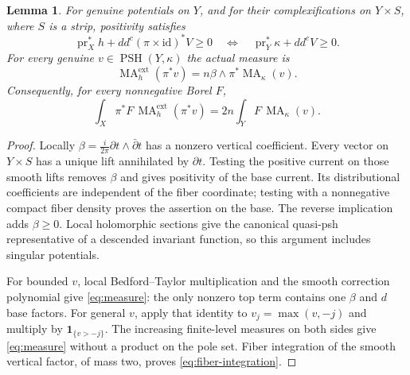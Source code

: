 \documentclass[11pt]{article}
\newcommand{\ddc}{dd^c}
\newcommand{\PSH}{\operatorname{PSH}}
\newcommand{\MA}{\operatorname{MA}}
\newtheorem{lemma}[theorem]{Lemma}
\theoremstyle{remark}\newtheorem{remark}[theorem]{Remark}
\begin{document}
\begin{lemma}\label{lem:descent}
For genuine potentials on $Y$, and for their complexifications on
$Y\times S$, where $S$ is a strip, positivity satisfies
\[
 \operatorname{pr}_X^*h+\ddc(\pi\times\mathrm{id})^*V\geq0
 \quad\Longleftrightarrow\quad
 \operatorname{pr}_Y^*\kappa+\ddc V\geq0.
\]
For every genuine $v\in\PSH(Y,\kappa)$ the actual measure is
\begin{equation}\label{eq:measure}
 \MA_h^{\mathrm{ext}}(\pi^*v)
     =n\beta\wedge\pi^*\MA_\kappa(v).
\end{equation}
Consequently, for every nonnegative Borel $F$,
\begin{equation}\label{eq:fiber-integration}
 \int_X\pi^*F\,\MA_h^{\mathrm{ext}}(\pi^*v)
       =2n\int_YF\,\MA_\kappa(v).
\end{equation}
\end{lemma}
\begin{proof}
Locally $\beta=\frac{i}{2\pi}\partial t\wedge\bar\partial t$ has
a nonzero vertical coefficient. Every vector on $Y\times S$ has a unique
lift annihilated by $\partial t$. Testing the positive current on those
smooth lifts removes $\beta$ and gives positivity of the base current.
Its distributional coefficients are independent of the fiber coordinate;
testing with a nonnegative compact fiber density proves the assertion
on the base. The reverse implication adds $\beta\geq0$. Local
holomorphic sections give the canonical quasi-psh representative of a
descended invariant function, so this argument includes singular potentials.

For bounded $v$, local Bedford--Taylor multiplication and the smooth
correction polynomial give \eqref{eq:measure}: the only nonzero top term
contains one $\beta$ and $d$ base factors. For general $v$, apply that
identity to $v_j=\max(v,-j)$ and multiply by
$\mathbf1_{\{v>-j\}}$. The increasing finite-level measures on both
sides give \eqref{eq:measure} without a product on the pole set.
Fiber integration of the smooth vertical factor, of mass two, proves
\eqref{eq:fiber-integration}.
\end{proof}
\end{document}
